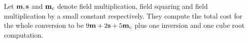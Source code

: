 %
%
%
%
%
Let $\textbf{m}, \textbf{s}$ and $\textbf{m}_{c}$ denote
field multiplication, field squaring and field multiplication by a small constant respectively.
They compute the total cost for the whole conversion to be $9\textbf{m} + 2\textbf{s} + 5\textbf{m}_{c}$
plus one inversion and one cube root computation.


